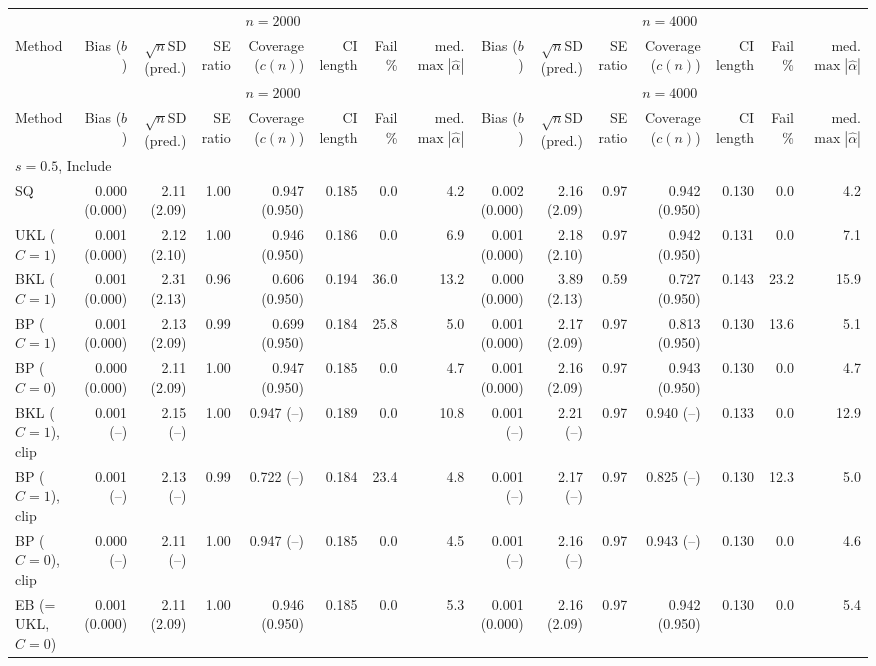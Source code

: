 \begin{tabular}{lrrrrrrrrrrrrrr}
\hline
 & \multicolumn{7}{c}{$n=2000$} & \multicolumn{7}{c}{$n=4000$} \\
Method & Bias ($b$) & $\sqrt{n}$SD (pred.) & SE ratio & Coverage ($c(n)$) & CI length & Fail \% & med. $\max|\widehat\alpha|$ & Bias ($b$) & $\sqrt{n}$SD (pred.) & SE ratio & Coverage ($c(n)$) & CI length & Fail \% & med. $\max|\widehat\alpha|$ \\
\hline
\endfirsthead
\hline
 & \multicolumn{7}{c}{$n=2000$} & \multicolumn{7}{c}{$n=4000$} \\
Method & Bias ($b$) & $\sqrt{n}$SD (pred.) & SE ratio & Coverage ($c(n)$) & CI length & Fail \% & med. $\max|\widehat\alpha|$ & Bias ($b$) & $\sqrt{n}$SD (pred.) & SE ratio & Coverage ($c(n)$) & CI length & Fail \% & med. $\max|\widehat\alpha|$ \\
\hline
\endhead
\multicolumn{15}{l}{$s=0.5$, Include} \\
SQ & 0.000 (0.000) & 2.11 (2.09) & 1.00 & 0.947 (0.950) & 0.185 & 0.0 & 4.2 & 0.002 (0.000) & 2.16 (2.09) & 0.97 & 0.942 (0.950) & 0.130 & 0.0 & 4.2 \\
UKL ($C=1$) & 0.001 (0.000) & 2.12 (2.10) & 1.00 & 0.946 (0.950) & 0.186 & 0.0 & 6.9 & 0.001 (0.000) & 2.18 (2.10) & 0.97 & 0.942 (0.950) & 0.131 & 0.0 & 7.1 \\
BKL ($C=1$) & 0.001 (0.000) & 2.31 (2.13) & 0.96 & 0.606 (0.950) & 0.194 & 36.0 & 13.2 & 0.000 (0.000) & 3.89 (2.13) & 0.59 & 0.727 (0.950) & 0.143 & 23.2 & 15.9 \\
BP ($C=1$) & 0.001 (0.000) & 2.13 (2.09) & 0.99 & 0.699 (0.950) & 0.184 & 25.8 & 5.0 & 0.001 (0.000) & 2.17 (2.09) & 0.97 & 0.813 (0.950) & 0.130 & 13.6 & 5.1 \\
BP ($C=0$) & 0.000 (0.000) & 2.11 (2.09) & 1.00 & 0.947 (0.950) & 0.185 & 0.0 & 4.7 & 0.001 (0.000) & 2.16 (2.09) & 0.97 & 0.943 (0.950) & 0.130 & 0.0 & 4.7 \\
BKL ($C=1$), clip & 0.001 (--) & 2.15 (--) & 1.00 & 0.947 (--) & 0.189 & 0.0 & 10.8 & 0.001 (--) & 2.21 (--) & 0.97 & 0.940 (--) & 0.133 & 0.0 & 12.9 \\
BP ($C=1$), clip & 0.001 (--) & 2.13 (--) & 0.99 & 0.722 (--) & 0.184 & 23.4 & 4.8 & 0.001 (--) & 2.17 (--) & 0.97 & 0.825 (--) & 0.130 & 12.3 & 5.0 \\
BP ($C=0$), clip & 0.000 (--) & 2.11 (--) & 1.00 & 0.947 (--) & 0.185 & 0.0 & 4.5 & 0.001 (--) & 2.16 (--) & 0.97 & 0.943 (--) & 0.130 & 0.0 & 4.6 \\
EB (= UKL, $C=0$) & 0.001 (0.000) & 2.11 (2.09) & 1.00 & 0.946 (0.950) & 0.185 & 0.0 & 5.3 & 0.001 (0.000) & 2.16 (2.09) & 0.97 & 0.942 (0.950) & 0.130 & 0.0 & 5.4 \\

\end{tabular}

